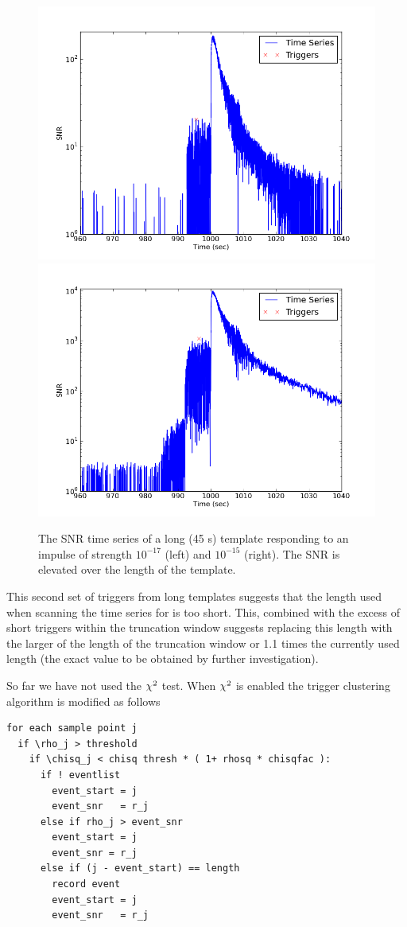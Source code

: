 \begin{figure}
  \includegraphics[width=0.5\linewidth]{figures/detchar/snrs_17_long}
  \includegraphics[width=0.5\linewidth]{figures/detchar/snrs_15_long}
  \caption[SNR time series of a long template and loud impulse] {
The SNR time series of a long (45 s) template responding to an
impulse of strength $10^{-17}$ (left) and $10^{-15}$ (right).  The SNR
is elevated over the length of the template. 
  \label{f:long_snr_series}
}
\end{figure}%

This second set of triggers from long templates suggests that the
length used when scanning the time series for is too short.  This,
combined with the excess of short triggers within the truncation
window suggests replacing this length with the larger of the length of
the truncation window or 1.1 times the currently used length (the
exact value to be obtained by further investigation).

So far we have not used the $\chi^2$ test.  When $\chi^2$ is
enabled the trigger clustering algorithm is modified as follows

\begin{verbatim}
for each sample point j
  if \rho_j > threshold
    if \chisq_j < chisq thresh * ( 1+ rhosq * chisqfac ):
      if ! eventlist
        event_start = j
        event_snr   = r_j
      else if rho_j > event_snr
        event_start = j
        event_snr = r_j
      else if (j - event_start) == length
        record event
        event_start = j
        event_snr   = r_j
\end{verbatim}

